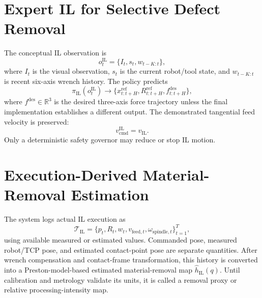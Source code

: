 \section{Expert IL for Selective Defect Removal}
The conceptual IL observation is
\begin{equation}
  o_t^{\mathrm{IL}}=\{I_t,s_t,w_{t-K:t}\},
  \label{eq:il_observation}
\end{equation}
where \(I_t\) is the visual observation, \(s_t\) is the current robot/tool state, and \(w_{t-K:t}\) is recent six-axis wrench history. The policy predicts
\begin{equation}
  \pi_{\mathrm{IL}}(o_t^{\mathrm{IL}})
  \rightarrow
  \{x^{\mathrm{ref}}_{t:t+H},
    R^{\mathrm{ref}}_{t:t+H},
    f^{\mathrm{des}}_{t:t+H}\},
  \label{eq:il_policy_overview}
\end{equation}
where \(f^{\mathrm{des}}\in\mathbb{R}^{3}\) is the desired three-axis force trajectory unless the final implementation establishes a different output. The demonstrated tangential feed velocity is preserved:
\begin{equation}
  v_{\mathrm{cmd}}^{\mathrm{IL}}=v_{\mathrm{IL}}.
  \label{eq:preserve_il_velocity}
\end{equation}
Only a deterministic safety governor may reduce or stop IL motion.

\section{Execution-Derived Material-Removal Estimation}
The system logs actual IL execution as
\begin{equation}
  \mathcal{T}_{\mathrm{IL}}
  =
  \{p_t,R_t,w_t,v_{\mathrm{feed},t},\omega_{\mathrm{spindle},t}\}_{t=1}^{T},
  \label{eq:il_execution_log}
\end{equation}
using available measured or estimated values. Commanded pose, measured robot/TCP pose, and estimated contact-point pose are separate quantities. After wrench compensation and contact-frame transformation, this history is converted into a Preston-model-based estimated material-removal map \(\hat h_{\mathrm{IL}}(q)\). Until calibration and metrology validate its units, it is called a removal proxy or relative processing-intensity map.


